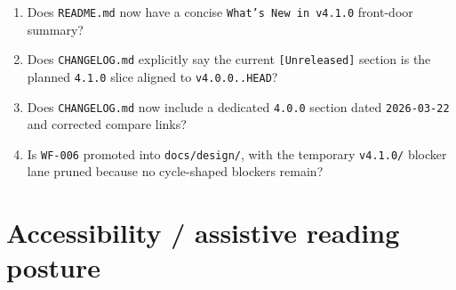 \begin{enumerate}
\def\labelenumi{\arabic{enumi}.}
\tightlist
\item
  Does \texttt{R\allowbreak{}E\allowbreak{}A\allowbreak{}D\allowbreak{}M\allowbreak{}E\allowbreak{}.\allowbreak{}m\allowbreak{}d} now have a concise \texttt{W\allowbreak{}h\allowbreak{}a\allowbreak{}t\allowbreak{}'\allowbreak{}s\allowbreak{} \allowbreak{}N\allowbreak{}e\allowbreak{}w\allowbreak{} \allowbreak{}i\allowbreak{}n\allowbreak{} \allowbreak{}v\allowbreak{}4\allowbreak{}.\allowbreak{}1\allowbreak{}.\allowbreak{}0} front-door summary?
\item
  Does \texttt{C\allowbreak{}H\allowbreak{}A\allowbreak{}N\allowbreak{}G\allowbreak{}E\allowbreak{}L\allowbreak{}O\allowbreak{}G\allowbreak{}.\allowbreak{}m\allowbreak{}d} explicitly say the current \texttt{[\allowbreak{}U\allowbreak{}n\allowbreak{}r\allowbreak{}e\allowbreak{}l\allowbreak{}e\allowbreak{}a\allowbreak{}s\allowbreak{}e\allowbreak{}d\allowbreak{}]} section is the planned \texttt{4\allowbreak{}.\allowbreak{}1\allowbreak{}.\allowbreak{}0} slice aligned to \texttt{v\allowbreak{}4\allowbreak{}.\allowbreak{}0\allowbreak{}.\allowbreak{}0\allowbreak{}.\allowbreak{}.\allowbreak{}H\allowbreak{}E\allowbreak{}A\allowbreak{}D}?
\item
  Does \texttt{C\allowbreak{}H\allowbreak{}A\allowbreak{}N\allowbreak{}G\allowbreak{}E\allowbreak{}L\allowbreak{}O\allowbreak{}G\allowbreak{}.\allowbreak{}m\allowbreak{}d} now include a dedicated \texttt{4\allowbreak{}.\allowbreak{}0\allowbreak{}.\allowbreak{}0} section dated \texttt{2\allowbreak{}0\allowbreak{}2\allowbreak{}6\allowbreak{}-\allowbreak{}0\allowbreak{}3\allowbreak{}-\allowbreak{}2\allowbreak{}2} and corrected compare links?
\item
  Is \texttt{W\allowbreak{}F\allowbreak{}-\allowbreak{}0\allowbreak{}0\allowbreak{}6} promoted into \texttt{d\allowbreak{}o\allowbreak{}c\allowbreak{}s\allowbreak{}/\allowbreak{}d\allowbreak{}e\allowbreak{}s\allowbreak{}i\allowbreak{}g\allowbreak{}n\allowbreak{}/}, with the temporary \texttt{v\allowbreak{}4\allowbreak{}.\allowbreak{}1\allowbreak{}.\allowbreak{}0\allowbreak{}/} blocker lane pruned because no cycle-shaped blockers remain?
\end{enumerate}

\section{Accessibility / assistive reading posture}\label{record-204-accessibility-assistive-reading-posture}

